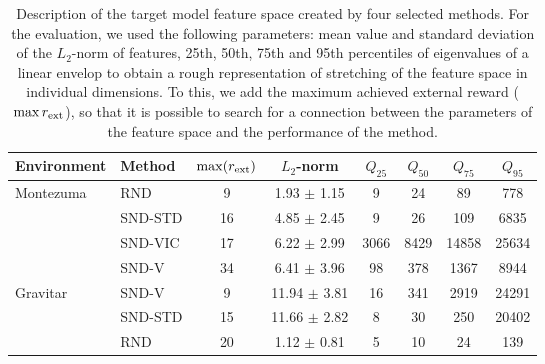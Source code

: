 \documentclass[a4paper,11pt]{elsarticle}
\begin{document}
\begin{table}[t!]
\scriptsize
\centering
\caption{Description of the target model feature space created by four selected methods. For the evaluation, we used the following parameters: mean value and standard deviation of the $L_{2}$-norm of features, 25th, 50th, 75th and 95th percentiles of eigenvalues of a linear envelop to obtain a rough representation of stretching of the feature space in individual dimensions. To this, we add the maximum achieved external reward ($\max{r_{\rm ext}}$), so that it is possible to search for a connection between the parameters of the feature space and the performance of the method.}
\begin{tabular}{l|l|cccccc}
\hline
 Environment & Method & $\max({r_{\rm ext}})$ & $L_2$-norm & $Q_{25}$ & $Q_{50}$ & $Q_{75}$ & $Q_{95}$ \\
\hline\hline
\multirow{4}{*}{Montezuma}
& \multicolumn{1}{l|}{RND} & \multicolumn{1}{c}{9} & \multicolumn{1}{c}{1.93 $\pm$ 1.15} & \multicolumn{1}{c}{9} & \multicolumn{1}{c}{24} & \multicolumn{1}{c}{89} & \multicolumn{1}{c}{778} \\
& \multicolumn{1}{l|}{SND-STD} & \multicolumn{1}{c}{16} & \multicolumn{1}{c}{4.85 $\pm$ 2.45} & \multicolumn{1}{c}{9} & \multicolumn{1}{c}{26} & \multicolumn{1}{c}{109} & \multicolumn{1}{c}{6835} \\
& \multicolumn{1}{l|}{SND-VIC} & \multicolumn{1}{c}{17} & \multicolumn{1}{c}{6.22 $\pm$ 2.99} & \multicolumn{1}{c}{3066} & \multicolumn{1}{c}{8429} & \multicolumn{1}{c}{14858} & \multicolumn{1}{c}{25634} \\
& \multicolumn{1}{l|}{SND-V} & \multicolumn{1}{c}{34} & \multicolumn{1}{c}{6.41 $\pm$ 3.96} & \multicolumn{1}{c}{98} & \multicolumn{1}{c}{378} & \multicolumn{1}{c}{1367} & \multicolumn{1}{c}{8944} \\
\hline \multirow{4}{*}{Gravitar}
& \multicolumn{1}{l|}{SND-V} & \multicolumn{1}{c}{9} & \multicolumn{1}{c}{11.94 $\pm$ 3.81} & \multicolumn{1}{c}{16} & \multicolumn{1}{c}{341} & \multicolumn{1}{c}{2919} & \multicolumn{1}{c}{24291} \\
& \multicolumn{1}{l|}{SND-STD} & \multicolumn{1}{c}{15} & \multicolumn{1}{c}{11.66 $\pm$ 2.82} & \multicolumn{1}{c}{8} & \multicolumn{1}{c}{30} & \multicolumn{1}{c}{250} & \multicolumn{1}{c}{20402} \\
& \multicolumn{1}{l|}{RND} & \multicolumn{1}{c}{20} & \multicolumn{1}{c}{1.12 $\pm$ 0.81} & \multicolumn{1}{c}{5} & \multicolumn{1}{c}{10} & \multicolumn{1}{c}{24} & \multicolumn{1}{c}{139} \\

\end{tabular}
\end{table}
\end{document}
